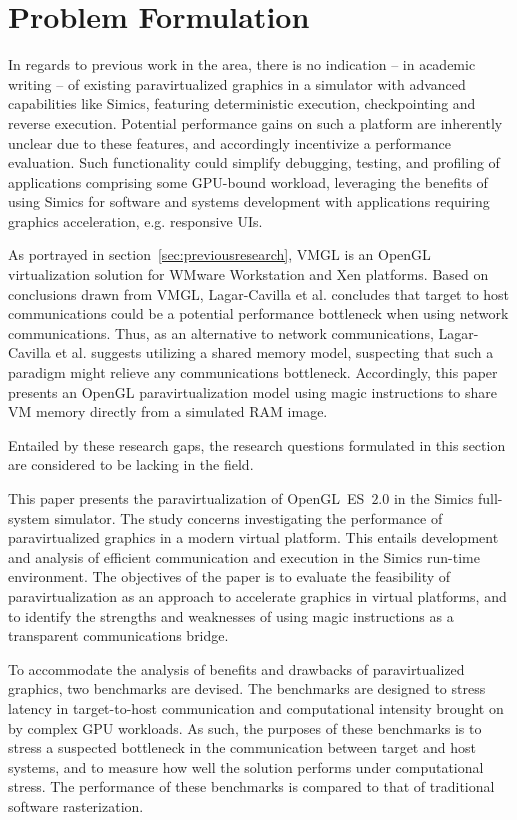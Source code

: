 
\section{Problem Formulation}
\label{sec:problemformulation}
In regards to previous work in the area, there is no indication -- in academic writing -- of existing paravirtualized graphics in a simulator with advanced capabilities like Simics, featuring deterministic execution, checkpointing and reverse execution.
Potential performance gains on such a platform are inherently unclear due to these features, and accordingly incentivize a performance evaluation.
Such functionality could simplify debugging, testing, and profiling of applications comprising some GPU-bound workload, leveraging the benefits of using Simics for software and systems development with applications requiring graphics acceleration, e.g. responsive UIs.

As portrayed in section~\ref{sec:previousresearch}, VMGL is an OpenGL virtualization solution for WMware Workstation and Xen platforms.
Based on conclusions drawn from VMGL, Lagar-Cavilla et al. concludes that target to host communications could be a potential performance bottleneck when using network communications.
Thus, as an alternative to network communications, Lagar-Cavilla et al. suggests utilizing a shared memory model, suspecting that such a paradigm might relieve any communications bottleneck.
Accordingly, this paper presents an OpenGL paravirtualization model using magic instructions to share VM memory directly from a simulated RAM image.

Entailed by these research gaps, the research questions formulated in this section are considered to be lacking in the field.

This paper presents the paravirtualization of OpenGL~ES~$2.0$ in the Simics full-system simulator. 
The study concerns investigating the performance of paravirtualized graphics in a modern virtual platform.
This entails development and analysis of efficient communication and execution in the Simics run-time environment.
The objectives of the paper is to evaluate the feasibility of paravirtualization as an approach to accelerate graphics in virtual platforms, and to identify the strengths and weaknesses of using magic instructions as a transparent communications bridge.

To accommodate the analysis of benefits and drawbacks of paravirtualized graphics, two benchmarks are devised.
The benchmarks are designed to stress latency in target-to-host communication and computational intensity brought on by complex GPU workloads.
As such, the purposes of these benchmarks is to stress a suspected bottleneck in the communication between target and host systems, and to measure how well the solution performs under computational stress.
The performance of these benchmarks is compared to that of traditional software rasterization.

